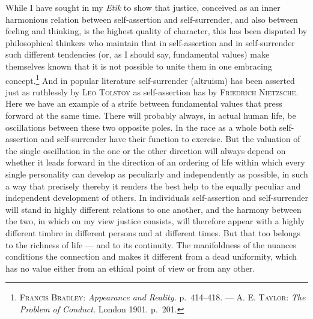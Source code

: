 \documentclass[12pt,a4paper]{book}
\begin{document}
While I have sought in my \textit{Etik} to show that justice, conceived as an
inner harmonious relation between self-assertion and self-surrender, and also
between feeling and thinking, is the highest quality of character, this has been
disputed by philosophical thinkers who maintain that in self-assertion and in
self-surrender such different tendencies (or, as I should say, fundamental
values) make themselves known that it is not possible to unite them in one
embracing concept.\footnote{\textsc{Francis Bradley}: \textit{Appearance and
Reality.} p.~414--418. --- \textsc{A. E. Taylor}: \textit{The Problem of
Conduct.} London 1901. p.~201.} And in popular literature self-surrender
(altruism) has been asserted just as ruthlessly by \textsc{Leo Tolstoy} as
self-assertion has by \textsc{Friedrich Nietzsche}. Here we have an example of a
strife between fundamental values that press forward at the same time. There will
probably always, in actual human life, be oscillations between these two opposite
poles. In the race as a whole both self-assertion and self-surrender have their
function to exercise. But the valuation of the single oscillation in the one or
the other direction will always depend on whether it leads forward in the
direction of an ordering of life within which every single personality can
develop as peculiarly and independently as possible, in such a way that precisely
thereby it renders the best help to the equally peculiar and independent
development of others. In individuals self-assertion and self-surrender will
stand in highly different relations to one another, and the harmony between the
two, in which on my view justice consists, will therefore appear with a highly
different timbre in different persons and at different times. But that too
belongs to the richness of life --- and to its continuity. The manifoldness of
the nuances conditions the connection and makes it different from a dead
uniformity, which has no value either from an ethical point of view or from any
other.
\end{document}
